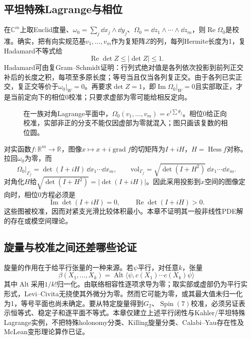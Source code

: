 \subsection{平坦特殊Lagrange与相位}
在$\mathbb C^m$上取Euclid度量、$\omega_0=\sum_j\dd x_j\wedge\dd y_j$、$\Omega_0=\dd z_1\wedge\cdots\wedge\dd z_m$，则$\operatorname{Re}\Omega_0$是校准。确实，把有向实规范基$v_1,\ldots,v_m$作为复矩阵$Z$的列，每列Hermite长度为1，复Hadamard不等式给
\[
 \operatorname{Re}\det Z\leq|\det Z|\leq1.
\]
Hadamard可由复Gram--Schmidt证明：行列式绝对值是各列依次投影到前列正交补后的长度之积，每项至多原长度；等号当且仅当各列复正交。由于各列已实正交，复正交等价于$\omega_0|_W=0$。再要求$\det Z=1$，即$\operatorname{Im}\Omega_0|_W=0$且实部取正，才是当前定向下的相位0校准；只要求虚部为零可能给相反定向。

\begin{figure}[htbp]
\centering
\caption{在一族对角Lagrange平面中，$\Omega_0(v_1,\ldots,v_m)=e^{i\sum\theta_j}$。相位0给正向校准，实部非正的分支不能仅因虚部为零就混入；图只画该复数的相位圆。}
\label{fig:calibration-phase}
\end{figure}

对实函数$f:\mathbb R^m\to\mathbb R$，图像$x\mapsto x+i\operatorname{grad}f$的切矩阵为$I+iH$，$H=\operatorname{Hess}f$对称。拉回$\omega_0$为零，而
\begin{equation}\label{eq:special-lagrangian-graph}
 \Omega_0|_{\Gamma_f}=\det(I+iH)\,\dd x_1\cdots\dd x_m,
 \qquad \mathrm{vol}_{\Gamma_f}=\sqrt{\det(I+H^2)}\,\dd x_1\cdots\dd x_m.
\end{equation}
对角化$H$给$\sqrt{\det(I+H^2)}=|\det(I+iH)|$。因此采用投影到$x$空间的图像定向时，相位0方程必须是
\[
 \operatorname{Im}\det(I+iH)=0,\qquad \operatorname{Re}\det(I+iH)>0.
\]
这些图被校准，因而对紧支光滑比较体积最小。本章不证明其一般非线性PDE解的存在或模空间理论。

\subsection{旋量与校准之间还差哪些论证}
旋量的作用在于给平行张量的一种来源。若$\psi$平行，对任意$k$，张量
\[
 \beta(X_1,\ldots,X_k)=\operatorname{Alt}
 \langle\psi,c(X_1)\cdots c(X_k)\psi\rangle
\]
其中$\operatorname{Alt}$采用$1/k!$归一化。由联络相容性逐项求导为零；取实部或虚部仍为平行实形式，Levi--Civita无挠使其外微分为零。然而它可能为零，或其最大值未归一化为1，等号平面也尚未确定。要从特定旋量得到$G_2$、$\operatorname{Spin}(7)$校准，必须另证表示恒等式、稳定子和逐平面不等式。本章仅建立上述平行闭性与Kahler/平坦特殊Lagrange实例，不把特殊holonomy分类、Killing旋量分类、Calabi--Yau存在性及McLean变形理论算作已证。
